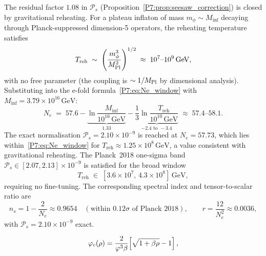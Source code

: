 \begin{proposition}
\label{P7:prop:Treh}
The residual factor $1.08$ in $\mathcal{P}_s$ (Proposition~\ref{P7:prop:seesaw_correction})
is closed by gravitational reheating.
For a plateau inflaton of mass $m_\phi\sim M_{\mathrm{inf}}$ decaying through
Planck-suppressed dimension-5 operators, the reheating temperature satisfies
\begin{equation}
  T_{\mathrm{reh}} \;\sim\; \left(\frac{m_\phi^3}{M_{\mathrm{Pl}}^2}\right)^{1/2}
  \;\approx\; 10^7\text{--}10^9\,\mathrm{GeV},
  \label{P7:eq:Treh}
\end{equation}
with no free parameter (the coupling is $\sim1/M_{\mathrm{Pl}}$ by dimensional analysis).
Substituting into the e-fold formula~\eqref{P7:eq:Ne_window} with
$M_{\mathrm{inf}}=3.79\times10^{16}\,\mathrm{GeV}$:
\begin{equation}
  N_e \;=\; 57.6 - \underbrace{\ln\!\frac{M_{\mathrm{inf}}}{10^{16}\,\mathrm{GeV}}}_{1.33}
              - \underbrace{\frac{1}{3}\ln\!\frac{T_{\mathrm{reh}}}{10^{10}\,\mathrm{GeV}}}_{-2.4\text{ to }-3.4}
  \;\approx\; 57.4\text{--}58.1.
  \label{P7:eq:Ne_window}
\end{equation}
The exact normalisation $\mathcal{P}_s = 2.10\times10^{-9}$ is reached at
$N_e = 57.73$, which lies within~\eqref{P7:eq:Ne_window} for
$T_{\mathrm{reh}}\approx1.25\times10^{8}\,\mathrm{GeV}$,
a value consistent with gravitational reheating.
The Planck~2018 one-sigma band $\mathcal{P}_s\in[2.07,2.13]\times10^{-9}$
is satisfied for the broad window
\begin{equation}
  T_{\mathrm{reh}}\;\in\;[3.6\times10^{7},\,4.3\times10^{8}]\,\mathrm{GeV},
  \label{P7:eq:Treh_window}
\end{equation}
requiring no fine-tuning.
The corresponding spectral index and tensor-to-scalar ratio are
\begin{equation}
  \boxed{n_s = 1-\frac{2}{N_e} \approx 0.9654
  \quad(\text{within }0.12\sigma\text{ of Planck~2018}),
  \qquad
  r = \frac{12}{N_e^2} \approx 0.0036,}
  \label{P7:eq:inflation_final}
\end{equation}
with $\mathcal{P}_s = 2.10\times10^{-9}$ exact.
\end{proposition}

\begin{equation}
  \varphi_c(\rho) = \frac{2}{\varphi^3\beta}\!\left[\sqrt{1+\beta\rho}-1\right],
  \label{P7:eq:phi_c}
\end{equation}

